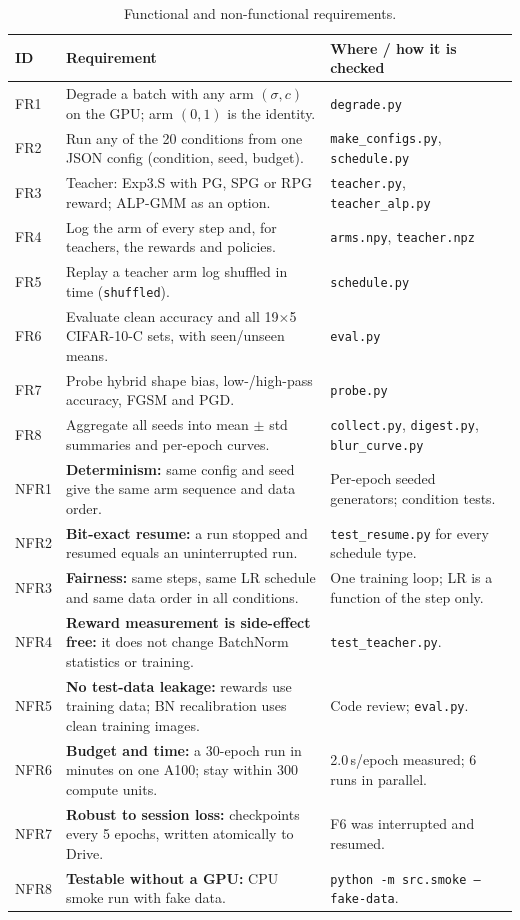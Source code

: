 \documentclass[a4paper,12pt]{report}
\newcommand{\cond}[1]{\texttt{#1}}
\begin{document}
\begin{table}[htbp]
\caption{Functional and non-functional requirements.}
\label{tab:req}
\begin{center}
\footnotesize
\renewcommand{\arraystretch}{1.0}
\begin{tabular}{|l|P{8.1cm}|P{5.0cm}|} \hline
\textbf{ID} & \textbf{Requirement} & \textbf{Where / how it is checked} \\ \hline
FR1 & Degrade a batch with any arm $(\sigma, c)$ on the GPU; arm $(0,1)$ is the identity. & \texttt{degrade.py} \\
FR2 & Run any of the 20 conditions from one JSON config (condition, seed, budget). & \texttt{make\_configs.py}, \texttt{schedule.py} \\
FR3 & Teacher: Exp3.S with PG, SPG or RPG reward; ALP-GMM as an option. & \texttt{teacher.py}, \texttt{teacher\_alp.py} \\
FR4 & Log the arm of every step and, for teachers, the rewards and policies. & \texttt{arms.npy}, \texttt{teacher.npz} \\
FR5 & Replay a teacher arm log shuffled in time (\cond{shuffled}). & \texttt{schedule.py} \\
FR6 & Evaluate clean accuracy and all 19$\times$5 CIFAR-10-C sets, with seen/unseen means. & \texttt{eval.py} \\
FR7 & Probe hybrid shape bias, low-/high-pass accuracy, FGSM and PGD. & \texttt{probe.py} \\
FR8 & Aggregate all seeds into mean $\pm$ std summaries and per-epoch curves. & \texttt{collect.py}, \texttt{digest.py}, \texttt{blur\_curve.py} \\ \hline
NFR1 & \textbf{Determinism:} same config and seed give the same arm sequence and data order. & Per-epoch seeded generators; condition tests. \\
NFR2 & \textbf{Bit-exact resume:} a run stopped and resumed equals an uninterrupted run. & \texttt{test\_resume.py} for every schedule type. \\
NFR3 & \textbf{Fairness:} same steps, same LR schedule and same data order in all conditions. & One training loop; LR is a function of the step only. \\
NFR4 & \textbf{Reward measurement is side-effect free:} it does not change BatchNorm statistics or training. & \texttt{test\_teacher.py}. \\
NFR5 & \textbf{No test-data leakage:} rewards use training data; BN recalibration uses clean training images. & Code review; \texttt{eval.py}. \\
NFR6 & \textbf{Budget and time:} a 30-epoch run in minutes on one A100; stay within 300 compute units. & 2.0\,s/epoch measured; 6 runs in parallel. \\
NFR7 & \textbf{Robust to session loss:} checkpoints every 5 epochs, written atomically to Drive. & F6 was interrupted and resumed. \\
NFR8 & \textbf{Testable without a GPU:} CPU smoke run with fake data. & \texttt{python -m src.smoke --fake-data}. \\ \hline
\end{tabular}
\end{center}
\end{table}
\end{document}
